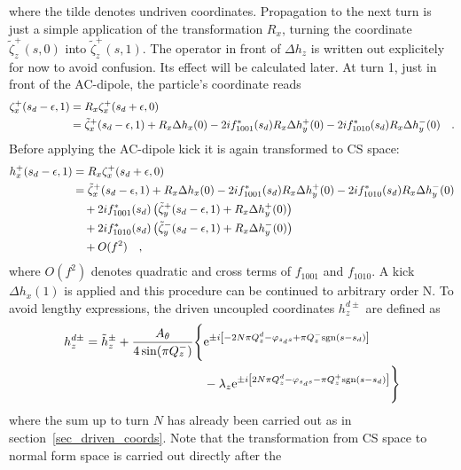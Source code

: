 %
where the tilde denotes undriven coordinates.
Propagation to the next turn is just a simple application of the transformation $R_x$, turning the
coordinate $\tilde{\zeta}_z^+(s,0)$ into $\tilde{\zeta}_z^+(s,1)$. The operator in front of $\Delta h_z$
is written out explicitely for now to avoid confusion. Its effect will be calculated later.
At turn 1, just in front of the AC-dipole, the particle's coordinate reads
%
\begin{align}
    \zeta_x^+(s_d-\epsilon, 1) &= R_x\zeta_x^+(s_d+\epsilon, 0) \notag \\
        &= \tilde{\zeta}_x^+(s_d-\epsilon, 1) + R_x\Delta h_x(0)
            - 2if_{1001}^*(s_d) R_x\Delta h_y^+(0)
            - 2if_{1010}^*(s_d) R_x\Delta h_y^-(0)
            \quad .
\end{align}
%
Before applying the AC-dipole kick it is again transformed to CS space:
%
\begin{align}
    h_x^+(s_d-\epsilon, 1) &=R_x\zeta_x^+(s_d+\epsilon, 0) \notag \\
        &=
        \tilde{\zeta}_x^+(s_d-\epsilon, 1) + R_x\Delta h_x(0)
            - 2if_{1001}^*(s_d) R_x\Delta h_y^+(0)
            - 2if_{1010}^*(s_d) R_x\Delta h_y^-(0)
        \notag \\ &\quad 
            + 2if_{1001}^*(s_d) \left(\tilde{\zeta}_y^+(s_d-\epsilon, 1) + R_x\Delta h_y^+(0) \right)
        \notag \\ &\quad 
            + 2if_{1010}^*(s_d) \left(\tilde{\zeta}_y^-(s_d-\epsilon, 1) + R_x\Delta h_y^-(0) \right)
        \notag \\ &\quad
            + O(f^2)
        \quad ,
    \label{eq_cpl_drv_n1}
\end{align}
%
where $O(f^2)$ denotes quadratic and cross terms of $f_{1001}$ and $f_{1010}$. 
A kick $\Delta h_x(1)$ is applied and this procedure can be continued to arbitrary order N.
To avoid lengthy expressions, the driven uncoupled coordinates $h_z^{d\pm}$ are defined as
%
\begin{align}
    h_z^{d\pm} = \tilde{h}_z^{\pm} 
    +\frac{A_\theta}{4\sin(\pi Q_z^-)} \Bigg\{&
    \text{e}^{\pm i\left[-2N\pi Q_z^d - \varphi_{s_ds} + \pi Q_z^-\text{sgn}(s-s_d)\right]}
    \notag\\
    &- \lambda_z\text{e}^{\pm i\left[2N\pi Q_z^d - \varphi_{s_ds} - \pi Q_z^+\text{sgn}(s-s_d)\right]}
    \Bigg\}
\end{align}
%
where the sum up to turn $N$ has already been carried out as in section~\ref{sec_driven_coords}.
Note that the transformation from CS space to normal form space is carried out directly after the 
